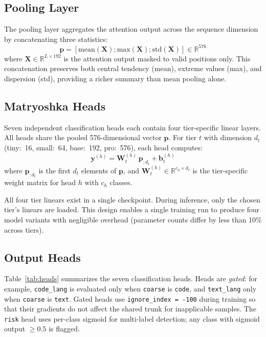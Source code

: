 \documentclass[11pt,a4paper]{article}
\begin{document}
\subsection{Pooling Layer}
The pooling layer aggregates the attention output across the sequence dimension by concatenating three statistics:
\begin{equation}
\mathbf{p} = [\text{mean}(\mathbf{X}); \text{max}(\mathbf{X}); \text{std}(\mathbf{X})] \in \mathbb{R}^{576}
\end{equation}
where $\mathbf{X} \in \mathbb{R}^{L \times 192}$ is the attention output masked to valid positions only.
This concatenation preserves both central tendency (mean), extreme values (max), and dispersion (std), providing a richer summary than mean pooling alone.

\subsection{Matryoshka Heads}
Seven independent classification heads each contain four tier-specific linear layers.
All heads share the pooled 576-dimensional vector $\mathbf{p}$.
For tier $t$ with dimension $d_t$ (tiny:~16, small:~64, base:~192, pro:~576), each head computes:
\begin{equation}
\mathbf{y}^{(h)} = \mathbf{W}^{(h)}_t \, \mathbf{p}_{:d_t} + \mathbf{b}^{(h)}_t
\end{equation}
where $\mathbf{p}_{:d_t}$ is the first $d_t$ elements of $\mathbf{p}$, and $\mathbf{W}^{(h)}_t \in \mathbb{R}^{c_h \times d_t}$ is the tier-specific weight matrix for head $h$ with $c_h$ classes.

All four tier linears exist in a single checkpoint.
During inference, only the chosen tier's linears are loaded.
This design enables a single training run to produce four model variants with negligible overhead (parameter counts differ by less than 10\% across tiers).

\subsection{Output Heads}
Table~\ref{tab:heads} summarizes the seven classification heads.
Heads are \emph{gated}: for example, \texttt{code\_lang} is evaluated only when \texttt{coarse} is \texttt{code}, and \texttt{text\_lang} only when \texttt{coarse} is \texttt{text}.
Gated heads use \texttt{ignore\_index = -100} during training so that their gradients do not affect the shared trunk for inapplicable samples.
The \texttt{risk} head uses per-class sigmoid for multi-label detection; any class with sigmoid output $\geq 0.5$ is flagged.
\end{document}
